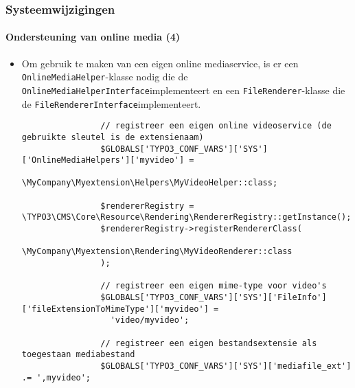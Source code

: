 \begin{frame}[fragile]
	\frametitle{Systeemwijzigingen}
	\framesubtitle{Ondersteuning van online media (4)}

	\lstset{basicstyle=\tiny\ttfamily}

	\begin{itemize}

		\item Om gebruik te maken van een eigen online mediaservice, is er een
			\small\texttt{OnlineMediaHelper}\normalsize-klasse nodig die de
			\small\texttt{OnlineMediaHelperInterface}\normalsize\space implementeert en een
			\small\texttt{FileRenderer}\normalsize-klasse die de
			\small\texttt{FileRendererInterface}\normalsize\space implementeert.

			\begin{lstlisting}
				// registreer een eigen online videoservice (de gebruikte sleutel is de extensienaam)
				$GLOBALS['TYPO3_CONF_VARS']['SYS']['OnlineMediaHelpers']['myvideo'] =
				  \MyCompany\Myextension\Helpers\MyVideoHelper::class;

				$rendererRegistry = \TYPO3\CMS\Core\Resource\Rendering\RendererRegistry::getInstance();
				$rendererRegistry->registerRendererClass(
				  \MyCompany\Myextension\Rendering\MyVideoRenderer::class
				);

				// registreer een eigen mime-type voor video's
				$GLOBALS['TYPO3_CONF_VARS']['SYS']['FileInfo']['fileExtensionToMimeType']['myvideo'] =
				  'video/myvideo';

				// registreer een eigen bestandsextensie als toegestaan mediabestand
				$GLOBALS['TYPO3_CONF_VARS']['SYS']['mediafile_ext'] .= ',myvideo';
			\end{lstlisting}

	\end{itemize}

\end{frame}


